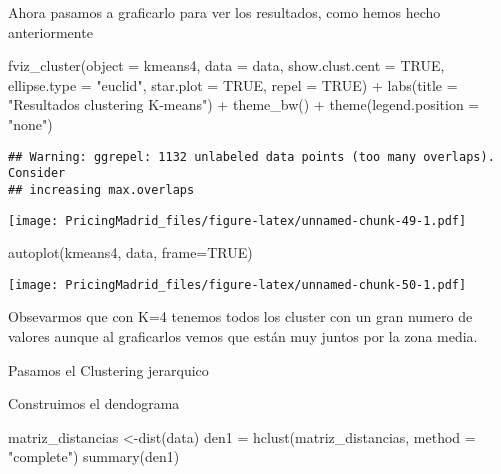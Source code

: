 \documentclass[
]{article}
\newenvironment{Shaded}{\begin{snugshade}}{\end{snugshade}}
\newcommand{\AttributeTok}[1]{\textcolor[rgb]{0.77,0.63,0.00}{#1}}
\newcommand{\ConstantTok}[1]{\textcolor[rgb]{0.00,0.00,0.00}{#1}}
\newcommand{\FunctionTok}[1]{\textcolor[rgb]{0.00,0.00,0.00}{#1}}
\newcommand{\NormalTok}[1]{#1}
\newcommand{\OtherTok}[1]{\textcolor[rgb]{0.56,0.35,0.01}{#1}}
\newcommand{\SpecialCharTok}[1]{\textcolor[rgb]{0.00,0.00,0.00}{#1}}
\newcommand{\StringTok}[1]{\textcolor[rgb]{0.31,0.60,0.02}{#1}}
\begin{document}
Ahora pasamos a graficarlo para ver los resultados, como hemos hecho
anteriormente

\begin{Shaded}
\begin{Highlighting}[]
\FunctionTok{fviz\_cluster}\NormalTok{(}\AttributeTok{object =}\NormalTok{ kmeans4, }\AttributeTok{data =}\NormalTok{ data, }\AttributeTok{show.clust.cent =} \ConstantTok{TRUE}\NormalTok{,}
             \AttributeTok{ellipse.type =} \StringTok{"euclid"}\NormalTok{, }\AttributeTok{star.plot =} \ConstantTok{TRUE}\NormalTok{, }\AttributeTok{repel =} \ConstantTok{TRUE}\NormalTok{) }\SpecialCharTok{+}
  \FunctionTok{labs}\NormalTok{(}\AttributeTok{title =} \StringTok{"Resultados clustering K{-}means"}\NormalTok{) }\SpecialCharTok{+}
  \FunctionTok{theme\_bw}\NormalTok{() }\SpecialCharTok{+}
  \FunctionTok{theme}\NormalTok{(}\AttributeTok{legend.position =} \StringTok{"none"}\NormalTok{)}
\end{Highlighting}
\end{Shaded}

\begin{verbatim}
## Warning: ggrepel: 1132 unlabeled data points (too many overlaps). Consider
## increasing max.overlaps
\end{verbatim}

\texttt{[image: PricingMadrid\_files/figure-latex/unnamed-chunk-49-1.pdf]}

\begin{Shaded}
\begin{Highlighting}[]
\FunctionTok{autoplot}\NormalTok{(kmeans4, data, }\AttributeTok{frame=}\ConstantTok{TRUE}\NormalTok{)}
\end{Highlighting}
\end{Shaded}

\texttt{[image: PricingMadrid\_files/figure-latex/unnamed-chunk-50-1.pdf]}

Obsevarmos que con K=4 tenemos todos los cluster con un gran numero de
valores aunque al graficarlos vemos que están muy juntos por la zona
media.

Pasamos el Clustering jerarquico

Construimos el dendograma

\begin{Shaded}
\begin{Highlighting}[]
\NormalTok{matriz\_distancias }\OtherTok{\textless{}{-}}\FunctionTok{dist}\NormalTok{(data)}
\NormalTok{den1 }\OtherTok{=} \FunctionTok{hclust}\NormalTok{(matriz\_distancias, }\AttributeTok{method =} \StringTok{"complete"}\NormalTok{)}
\FunctionTok{summary}\NormalTok{(den1)}
\end{Highlighting}
\end{Shaded}
\end{document}
